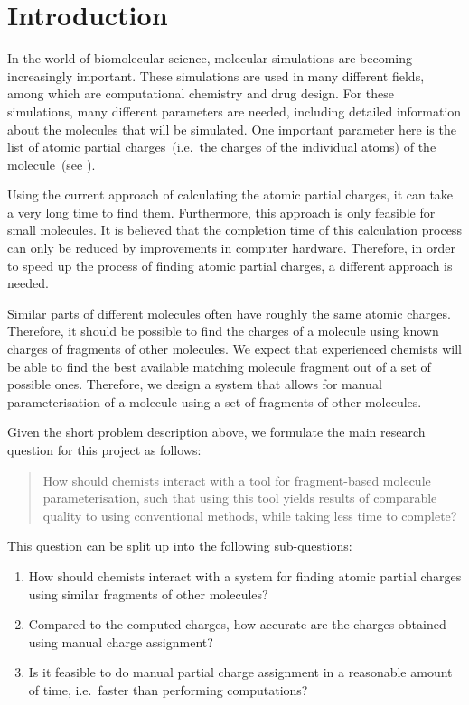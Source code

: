 \chapter{Introduction}

In the world of biomolecular science, molecular simulations are becoming increasingly important. These simulations are used in many different fields, among which are computational chemistry and drug design. For these simulations, many different parameters are needed, including detailed information about the molecules that will be simulated. One important parameter here is the list of atomic partial charges~(i.e.\ the charges of the individual atoms) of the molecule~(see ).

Using the current approach of calculating the atomic partial charges, it can take a very long time to find them. Furthermore, this approach is only feasible for small molecules. It is believed that the completion time of this calculation process can only be reduced by improvements in computer hardware. Therefore, in order to speed up the process of finding atomic partial charges, a different approach is needed.

Similar parts of different molecules often have roughly the same atomic charges. Therefore, it should be possible to find the charges of a molecule using known charges of fragments of other molecules. We expect that experienced chemists will be able to find the best available matching molecule fragment out of a set of possible ones. Therefore, we design a system that allows for manual parameterisation of a molecule using a set of fragments of other molecules.

Given the short problem description above, we formulate the main research question for this project as follows:
\begin{quote}
How should chemists interact with a tool for fragment-based molecule parameterisation, such that using this tool yields results of comparable quality to using conventional methods, while taking less time to complete?
\end{quote}

This question can be split up into the following sub-questions:
\begin{enumerate}
\item How should chemists interact with a system for finding atomic partial charges using similar fragments of other molecules?
\item Compared to the computed charges, how accurate are the charges obtained using manual charge assignment?
\item Is it feasible to do manual partial charge assignment in a reasonable amount of time, i.e.\ faster than performing computations?
\end{enumerate}

